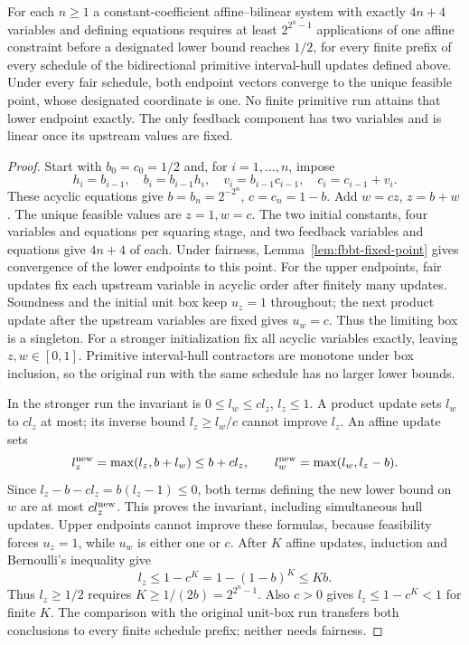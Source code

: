 \begin{proposition}\label{prop:fbbt-iterations}
For each $n\ge1$ a constant-coefficient affine--bilinear system with
exactly $4n+4$ variables and defining equations requires at least
$2^{2^n-1}$ applications of one affine constraint before a designated
lower bound reaches $1/2$,
for every finite prefix of every schedule of the bidirectional primitive
interval-hull updates defined above. Under every fair schedule, both
endpoint vectors converge to the unique feasible point, whose designated
coordinate is one. No finite primitive run attains that lower endpoint
exactly. The only feedback component has two variables and is linear
once its upstream values are fixed.
\end{proposition}
\begin{proof}
Start with $b_0=c_0=1/2$ and, for $i=1,\ldots,n$, impose
\[
 h_i=b_{i-1},\quad b_i=b_{i-1}h_i,\quad
 v_i=b_{i-1}c_{i-1},\quad c_i=c_{i-1}+v_i.
\]
These acyclic equations give $b=b_n=2^{-2^n}$, $c=c_n=1-b$.
Add $w=cz$, $z=b+w$. The unique feasible values are $z=1,w=c$.
The two initial constants, four variables and equations per squaring
stage, and two feedback variables and equations give $4n+4$ of each.
Under fairness, Lemma~\ref{lem:fbbt-fixed-point} gives convergence of
the lower endpoints to this point. For the upper endpoints, fair updates
fix each upstream variable in acyclic order after finitely many updates.
Soundness and the initial unit box keep $u_z=1$ throughout; the next
product update after the upstream variables are fixed gives $u_w=c$.
Thus the limiting box is a singleton.
For a stronger initialization fix all acyclic variables exactly, leaving
$z,w\in[0,1]$. Primitive interval-hull contractors are monotone under box
inclusion, so the original run with the same schedule has no larger lower
bounds.

In the stronger run the invariant is $0\le l_w\le cl_z$, $l_z\le1$.
A product update sets $l_w$ to $cl_z$ at most; its inverse bound
$l_z\ge l_w/c$ cannot improve $l_z$. An affine update sets
\[
 l_z^{\rm new}=\max(l_z,b+l_w)\le b+cl_z,\qquad
 l_w^{\rm new}=\max(l_w,l_z-b).
\]
Since $l_z-b-cl_z=b(l_z-1)\le0$, both terms defining the new lower bound
on $w$ are at most $cl_z^{\rm new}$. This proves the invariant, including
simultaneous hull updates. Upper endpoints cannot improve these formulas, because
feasibility forces $u_z=1$, while $u_w$ is either one or $c$.
After $K$ affine updates, induction and Bernoulli's inequality give
\[
 l_z\le1-c^K=1-(1-b)^K\le Kb.
\]
Thus $l_z\ge1/2$ requires $K\ge1/(2b)=2^{2^n-1}$.
Also $c>0$ gives $l_z\le1-c^K<1$ for finite $K$.
The comparison with the original unit-box run transfers both conclusions
to every finite schedule prefix; neither needs fairness.
\end{proof}
